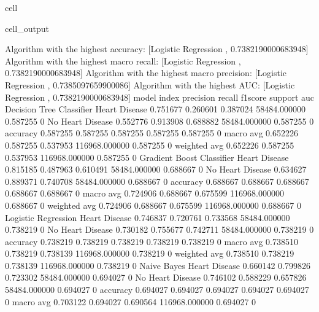 \documentclass[letterpaper,10pt,english]{jupyterBook}
\begin{document}
\begin{sphinxuseclass}{cell}
\begin{sphinxVerbatimOutput}
\begin{sphinxuseclass}{cell_output}
\begin{sphinxVerbatim}[commandchars=\\\{\}]
Algorithm with the highest accuracy: [\PYGZsq{}Logistic Regression \PYGZsq{}, 0.7382190000683948]
Algorithm with the highest macro recall:
        [\PYGZsq{}Logistic Regression \PYGZsq{}, 0.7382190000683948]
Algorithm with the highest macro precision:
        [\PYGZsq{}Logistic Regression \PYGZsq{}, 0.7385097659900086]
Algorithm with the highest AUC:
        [\PYGZsq{}Logistic Regression \PYGZsq{}, 0.7382190000683948]
model                      index             precision  recall    f1\PYGZhy{}score  support        auc     
Decision Tree Classifier   Heart Disease     0.751677   0.260601  0.387024  58484.000000   0.587255    0
                           No Heart Disease  0.552776   0.913908  0.688882  58484.000000   0.587255    0
                           accuracy          0.587255   0.587255  0.587255  0.587255       0.587255    0
                           macro avg         0.652226   0.587255  0.537953  116968.000000  0.587255    0
                           weighted avg      0.652226   0.587255  0.537953  116968.000000  0.587255    0
Gradient Boost Classifier  Heart Disease     0.815185   0.487963  0.610491  58484.000000   0.688667    0
                           No Heart Disease  0.634627   0.889371  0.740708  58484.000000   0.688667    0
                           accuracy          0.688667   0.688667  0.688667  0.688667       0.688667    0
                           macro avg         0.724906   0.688667  0.675599  116968.000000  0.688667    0
                           weighted avg      0.724906   0.688667  0.675599  116968.000000  0.688667    0
Logistic Regression        Heart Disease     0.746837   0.720761  0.733568  58484.000000   0.738219    0
                           No Heart Disease  0.730182   0.755677  0.742711  58484.000000   0.738219    0
                           accuracy          0.738219   0.738219  0.738219  0.738219       0.738219    0
                           macro avg         0.738510   0.738219  0.738139  116968.000000  0.738219    0
                           weighted avg      0.738510   0.738219  0.738139  116968.000000  0.738219    0
Naive Bayes                Heart Disease     0.660142   0.799826  0.723302  58484.000000   0.694027    0
                           No Heart Disease  0.746102   0.588229  0.657826  58484.000000   0.694027    0
                           accuracy          0.694027   0.694027  0.694027  0.694027       0.694027    0
                           macro avg         0.703122   0.694027  0.690564  116968.000000  0.694027    0

\end{sphinxVerbatim}
\end{sphinxuseclass}
\end{sphinxVerbatimOutput}
\end{sphinxuseclass}
\end{document}
